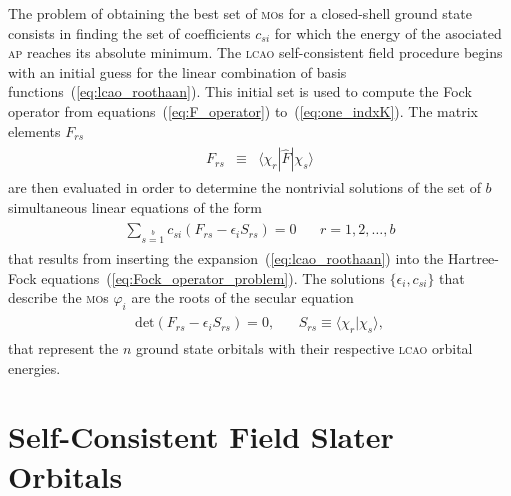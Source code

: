 The problem of obtaining the best set of \textsc{mo}s for a
closed-shell ground state consists in finding the set of coefficients
$c_{si}$ for which the energy of the asociated \textsc{ap} reaches its
absolute minimum. The \textsc{lcao} self-consistent field procedure
begins with an initial guess for the linear combination of basis
functions~(\ref{eq:lcao_roothaan}). This initial set is used to
compute the Fock operator from equations~(\ref{eq:F_operator})
to~(\ref{eq:one_indxK}). The matrix elements $F_{rs}$
%
\begin{eqnarray}
  \begin{split}
    F_{rs} & \equiv & \langle \chi_{r} | \hat{F} | \chi_{s} \rangle
  \end{split}
  \label{eq:F_matrix}
\end{eqnarray}
%
are then evaluated in order to determine the nontrivial solutions of
the set of $b$ simultaneous linear equations of the form
%
\begin{eqnarray}
  \begin{split}
    \sum\limits_{s=1}\limits^{b} c_{si} (F_{rs} - \epsilon_{i}S_{rs}) = 0 &
    ~~~~ r = 1,2,\dots,b
  \end{split}
  \label{eq:set_linear_eqs}
\end{eqnarray}
%
that results from inserting the expansion~(\ref{eq:lcao_roothaan})
into the Hartree-Fock equations~(\ref{eq:Fock_operator_problem}). The
solutions $\{\epsilon_{i}, c_{si}\}$ that describe the \textsc{mo}s
$\varphi_{i}$ are the roots of the secular
equation~\cite{Roothaan_HF,Levine_QChem}
%
\begin{eqnarray}
  \begin{split}
    \mathrm{det} (F_{rs} - \epsilon_{i}S_{rs}) = 0, &
    ~~~~ S_{rs} \equiv \langle \chi_{r} | \chi_{s} \rangle,
  \end{split}
  \label{eq:secular_eigenvalues}
\end{eqnarray}
%
that represent the $n$ ground state orbitals with their respective
\textsc{lcao} orbital energies.
  




\section{Self-Consistent Field Slater Orbitals}
\label{ch:scf_sto}





